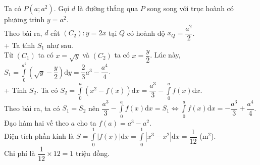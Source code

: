 \begin{ex}
{\begin{center}
\begin{tikzpicture}[scale=4,>=stealth]
			\end{tikzpicture}
			\end{center}
		Ta có $P(a; a^2)$. Gọi $d$ là đường thẳng qua $P$ song song với trục hoành có phương trình $y = a^2$.\\
		Theo bài ra, $d$ cắt $(C_2)\colon y = 2x$ tại $Q$ có hoành độ $x_Q = \dfrac{a^2}{2}$.\\ 
		+ Ta tính $S_1$ như sau.\\
		Từ $(C_1)$ ta có $x=\sqrt{y}$ và $(C_2)$ ta có $x=\dfrac{y}{2}$. Lúc này, $S_1 = \displaystyle\int\limits_{0}^{a^2} \left(\sqrt{y}-\dfrac{y}{2}\right)\mathrm{d}y =\dfrac{2}{3}a^3-\dfrac{a^4}{4}$.\\
		+ Tính $S_2$. Ta có $S_2 = \displaystyle\int\limits_{0}^{a} \left(x^2 - f(x)\right)\mathrm{d}x=\dfrac{a^3}{3}-\displaystyle\int\limits_{0}^{a} f(x)\mathrm{d}x$. \\
		Theo bài ra, ta có $S_1=S_2$ nên $\dfrac{a^3}{3}-\displaystyle\int\limits_{0}^{a} f(x)\mathrm{d}x= S_1 \Leftrightarrow \displaystyle\int\limits_{0}^{a} f(x)\mathrm{d}x = -\dfrac{a^3}{3} +\dfrac{a^4}{4}$.\\
		Đạo hàm hai vế theo $a$ cho ta $f(a) = a^3-a^2$.\\
		Diện tích phần kính là $S = \displaystyle\int\limits_{0}^{1} |f(x)| \mathrm{d}x = \displaystyle\int\limits_{0}^{1} |x^3 - x^2|\mathrm{d}x = \dfrac{1}{12}$ (m$^2$).\\
		Chi phí là $\dfrac{1}{12} \times 12 = 1$ triệu đồng.
	}
\end{ex}

